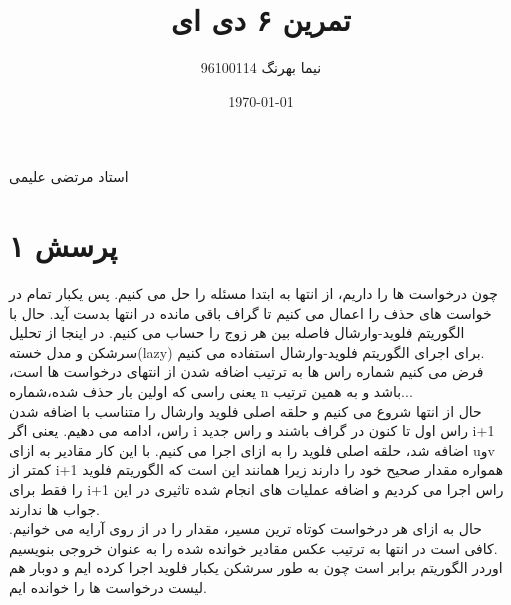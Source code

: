 \documentclass[a4paper]{article}
\title{تمرین ۶ دی ای}
\author{نیما بهرنگ 96100114}
\date{\today}
\begin{document}
\maketitle
\begin{center}
استاد مرتضی علیمی
\end{center}

\section*{پرسش ۱}
چون درخواست ها را داریم، از انتها به ابتدا مسئله را حل می کنیم. پس یکبار تمام در خواست های حذف را اعمال می کنیم تا گراف باقی مانده در انتها بدست آید. حال با الگوریتم فلوید-وارشال فاصله بین هر زوج را حساب می کنیم. در اینجا از تحلیل سرشکن و مدل خسته(lazy) برای اجرای الگوریتم فلوید-وارشال استفاده می کنیم.\\
فرض می کنیم شماره راس ها به ترتیب اضافه شدن از انتهای درخواست ها است، یعنی راسی که اولین بار حذف شده،شماره n باشد و به همین ترتیب...\\
حال از انتها شروع می کنیم و حلقه اصلی فلوید وارشال را متناسب با اضافه شدن راس، ادامه می دهیم. یعنی اگر i راس اول تا کنون در گراف باشند و راس جدید i+1 اضافه شد، حلقه اصلی فلوید را به ازای 
اجرا می کنیم. با این کار مقادیر 
به ازای uوv کمتر از i+1 همواره مقدار صحیح خود را دارند زیرا همانند این است که الگوریتم فلوید را فقط برای i+1 راس اجرا می کردیم و اضافه عملیات های انجام شده تاثیری در این جواب ها ندارند.\\
حال به ازای هر درخواست کوتاه ترین مسیر، مقدار را در
از روی آرایه 
می خوانیم. کافی است در انتها به ترتیب عکس مقادیر خوانده شده را به عنوان خروجی بنویسیم.\\
اوردر الگوریتم برابر 
است چون به طور سرشکن یکبار فلوید اجرا کرده ایم و دوبار هم لیست درخواست ها را خوانده ایم.\\

\pagebreak
\end{document}
